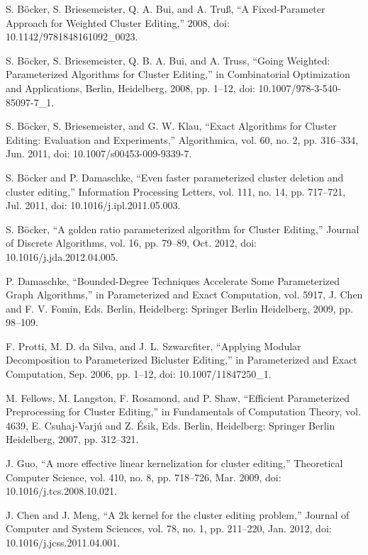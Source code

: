 \documentclass[12pt,oneside,english,parskip=full,headings=small]{scrbook}
\theoremstyle{definition}
\begin{document}
\begin{thebibliography}{99}
S. Böcker, S. Briesemeister, Q. A. Bui, and A. Truß, “A Fixed-Parameter Approach for Weighted
Cluster Editing,” 2008, doi: 10.1142/9781848161092\_0023.

S. Böcker, S. Briesemeister, Q. B. A. Bui, and A. Truss, “Going Weighted: Parameterized
Algorithms for Cluster Editing,” in Combinatorial Optimization and Applications, Berlin, Heidelberg,
2008, pp. 1–12, doi: 10.1007/978-3-540-85097-7\_1.

S. Böcker, S. Briesemeister, and G. W. Klau, “Exact Algorithms for Cluster Editing: Evaluation
and Experiments,” Algorithmica, vol. 60, no. 2, pp. 316–334, Jun. 2011, doi:
10.1007/s00453-009-9339-7.

S. Böcker and P. Damaschke, “Even faster parameterized cluster deletion and cluster editing,”
Information Processing Letters, vol. 111, no. 14, pp. 717–721, Jul. 2011, doi:
10.1016/j.ipl.2011.05.003.

S. Böcker, “A golden ratio parameterized algorithm for Cluster Editing,” Journal of Discrete
Algorithms, vol. 16, pp. 79–89, Oct. 2012, doi: 10.1016/j.jda.2012.04.005.

P. Damaschke, “Bounded-Degree Techniques Accelerate Some Parameterized Graph Algorithms,” in
Parameterized and Exact Computation, vol. 5917, J. Chen and F. V. Fomin, Eds. Berlin, Heidelberg:
Springer Berlin Heidelberg, 2009, pp. 98–109.

F. Protti, M. D. da Silva, and J. L. Szwarcfiter, “Applying Modular Decomposition to
Parameterized Bicluster Editing,” in Parameterized and Exact Computation, Sep. 2006, pp. 1–12, doi:
10.1007/11847250\_1.

M. Fellows, M. Langston, F. Rosamond, and P. Shaw, “Efficient Parameterized Preprocessing for
Cluster Editing,” in Fundamentals of Computation Theory, vol. 4639, E. Csuhaj-Varjú and Z. Ésik,
Eds. Berlin, Heidelberg: Springer Berlin Heidelberg, 2007, pp. 312–321.

J. Guo, “A more effective linear kernelization for cluster editing,” Theoretical
Computer Science, vol. 410, no. 8, pp. 718–726, Mar. 2009, doi: 10.1016/j.tcs.2008.10.021.

J. Chen and J. Meng, “A 2k kernel for the cluster editing problem,” Journal of Computer and
System Sciences, vol. 78, no. 1, pp. 211–220, Jan. 2012, doi: 10.1016/j.jcss.2011.04.001.


\end{thebibliography}
\end{document}
